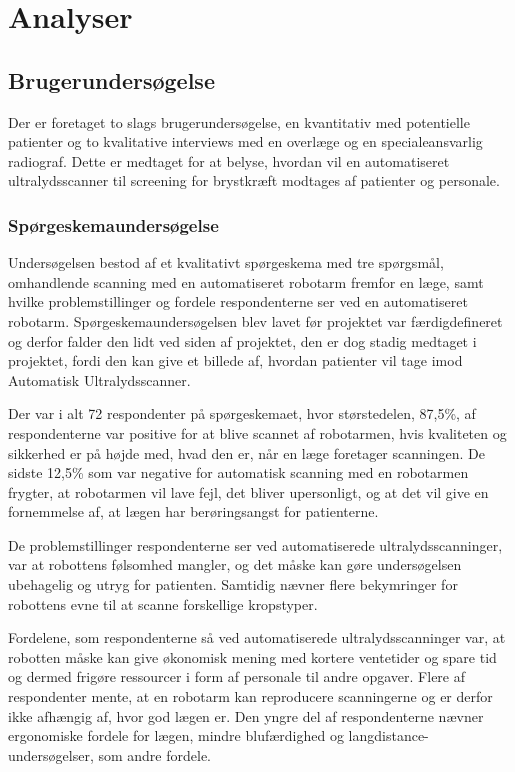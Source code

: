 \chapter{Analyser}\label{Analyser}

\section{Brugerundersøgelse}
Der er foretaget to slags brugerundersøgelse, en kvantitativ med potentielle patienter og to kvalitative interviews med en overlæge og en specialeansvarlig radiograf. Dette er medtaget for at belyse, hvordan vil en automatiseret ultralydsscanner til screening for brystkræft modtages af patienter og personale. 

\subsection{Spørgeskemaundersøgelse}
Undersøgelsen bestod af et kvalitativt spørgeskema med tre spørgsmål, omhandlende scanning med en automatiseret robotarm fremfor en læge, samt hvilke problemstillinger og fordele respondenterne ser ved en automatiseret robotarm. Spørgeskemaundersøgelsen blev lavet før projektet var færdigdefineret og derfor falder den lidt ved siden af projektet, den er dog stadig medtaget i projektet, fordi den kan give et billede af, hvordan patienter vil tage imod Automatisk Ultralydsscanner.  

Der var i alt 72 respondenter på spørgeskemaet, hvor størstedelen, 87,5\%, af respondenterne var positive for at blive scannet af robotarmen, hvis kvaliteten og sikkerhed er på højde med, hvad den er, når en læge foretager scanningen. De sidste 12,5\% som var negative for automatisk scanning med en robotarmen frygter, at robotarmen vil lave fejl, det bliver upersonligt, og at det vil give en fornemmelse af, at lægen har berøringsangst for patienterne. 

De problemstillinger respondenterne ser ved automatiserede ultralydsscanninger, var at robottens følsomhed mangler, og det måske kan gøre undersøgelsen ubehagelig og utryg for patienten. Samtidig nævner flere bekymringer for robottens evne til at scanne forskellige kropstyper.

Fordelene, som respondenterne så ved automatiserede ultralydsscanninger var, at robotten måske kan give økonomisk mening med kortere ventetider og spare tid og dermed frigøre ressourcer i form af personale til andre opgaver. Flere af respondenter mente, at en robotarm kan reproducere scanningerne og er derfor ikke afhængig af, hvor god lægen er. Den yngre del af respondenterne nævner ergonomiske fordele for lægen, mindre blufærdighed og langdistance-undersøgelser, som andre fordele. 

